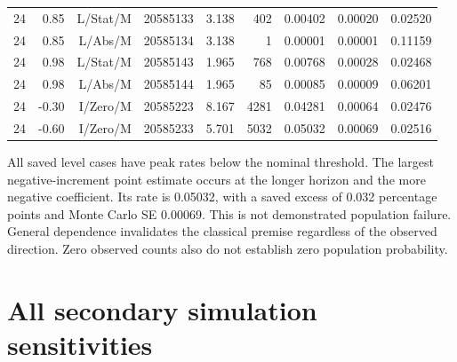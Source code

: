 \documentclass[11pt,a4paper]{article}
\begin{document}
\begin{longtable}{lrrrrrrrr}
24 & 0.85 & L/Stat/M & 20585133 & 3.138 & 402 & 0.00402 & 0.00020 & 0.02520 \\
24 & 0.85 & L/Abs/M & 20585134 & 3.138 & 1 & 0.00001 & 0.00001 & 0.11159 \\
24 & 0.98 & L/Stat/M & 20585143 & 1.965 & 768 & 0.00768 & 0.00028 & 0.02468 \\
24 & 0.98 & L/Abs/M & 20585144 & 1.965 & 85 & 0.00085 & 0.00009 & 0.06201 \\
24 & -0.30 & I/Zero/M & 20585223 & 8.167 & 4281 & 0.04281 & 0.00064 & 0.02476 \\
24 & -0.60 & I/Zero/M & 20585233 & 5.701 & 5032 & 0.05032 & 0.00069 & 0.02516 \\
\end{longtable}
\endgroup

All saved level cases have peak rates below the nominal threshold.
The largest negative-increment point estimate occurs at the longer horizon and
the more negative coefficient. Its rate is 0.05032,
with a saved excess of 0.032
percentage points and Monte Carlo SE 0.00069.
This is not demonstrated population failure. General dependence invalidates the
classical premise regardless of the observed direction. Zero observed counts
also do not establish zero population probability.\section{All secondary simulation sensitivities}\label{sup:simulation-secondary}
\end{document}
